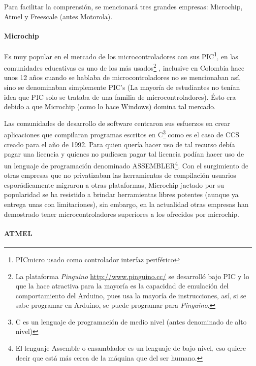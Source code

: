 \documentclass{article}
\begin{document}
Para facilitar la comprensión, se mencionará tres grandes empresas: 
Microchip, Atmel y Freescale (antes Motorola).

\paragraph{Microchip} 

Es muy popular en el mercado de los microcontroladores con sus
PIC\footnote{PICmicro usado como controlador interfaz periférico}, en las
comunidades educativas es uno de los más usados\footnote{ 
La plataforma \textit{Pinguino} \url{http://www.pinguino.cc/}
se desarrolló bajo PIC y lo que la hace atractiva para la mayoría es la 
capacidad de emulación del comportamiento del Arduino, pues usa la mayoría 
de instrucciones, así, 
si se sabe programar en Arduino, se puede programar para \textit{Pinguino}.}
, inclusive en Colombia hace unos 12 años cuando se hablaba de 
microcontroladores no se mencionaban así, sino se denominaban simplemente 
PIC's (La mayoría de estudiantes no tenían idea que PIC solo se trataba de 
una familia de microcontroladores). Ésto era debido a que Microchip (como 
lo hace Windows) domina tal mercado.

Las comunidades de desarrollo de 
software centraron sus esfuerzos en crear aplicaciones que compilaran 
programas escritos en C\footnote{ C es un lenguaje de programación de 
medio nivel (antes denominado de alto nivel)} como es el caso de CCS creado
para el año de 1992. Para quien quería hacer uso de tal recurso debía pagar
una licencia y quienes no pudiesen pagar tal licencia podían hacer uso
de un lenguaje de programación denominado ASSEMBLER\footnote{El lenguaje 
		Assemble o ensamblador es un lenguaje de bajo nivel, eso quiere
decir que está más cerca de la máquina que del ser humano.}. Con el
surgimiento de otras empresas que no privatizaban las herramientas de 
compilación usuarios esporádicamente migraron a otras plataformas,
Microchip jactado por su popularidad se ha resistido a brindar herramientas
libres potentes (aunque ya entrega unas con limitaciones), sin embargo, en
la actualidad otras empresas han demostrado tener microcontroladores 
superiores a los ofrecidos por microchip.

\paragraph{ATMEL}
\end{document}
